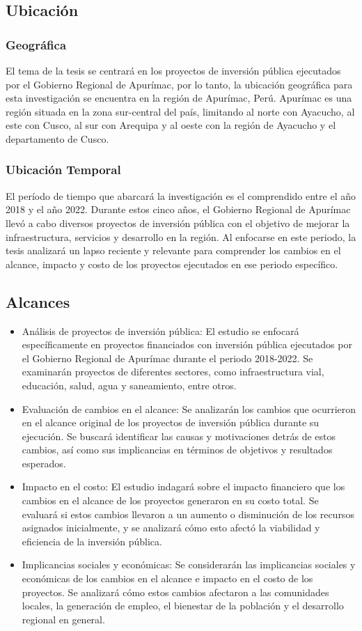\subsection{Ubicación}
\subsubsection{Geográfica}
El tema de la tesis se centrará en los proyectos de inversión pública ejecutados por el Gobierno Regional de Apurímac, por lo tanto, la ubicación geográfica para esta investigación se encuentra en la región de Apurímac, Perú. Apurímac es una región situada en la zona sur-central del país, limitando al norte con Ayacucho, al este con Cusco, al sur con Arequipa y al oeste con la región de Ayacucho y el departamento de Cusco.

\subsubsection{Ubicación Temporal}
El período de tiempo que abarcará la investigación es el comprendido entre el año 2018 y el año 2022. Durante estos cinco años, el Gobierno Regional de Apurímac llevó a cabo diversos proyectos de inversión pública con el objetivo de mejorar la infraestructura, servicios y desarrollo en la región. Al enfocarse en este periodo, la tesis analizará un lapso reciente y relevante para comprender los cambios en el alcance, impacto y costo de los proyectos ejecutados en ese periodo específico.

\subsection{Alcances}
\begin{itemize}
	\item Análisis de proyectos de inversión pública: El estudio se enfocará específicamente en proyectos financiados con inversión pública ejecutados por el Gobierno Regional de Apurímac durante el periodo 2018-2022. Se examinarán proyectos de diferentes sectores, como infraestructura vial, educación, salud, agua y saneamiento, entre otros.
	\item Evaluación de cambios en el alcance: Se analizarán los cambios que ocurrieron en el alcance original de los proyectos de inversión pública durante su ejecución. Se buscará identificar las causas y motivaciones detrás de estos cambios, así como sus implicancias en términos de objetivos y resultados esperados.
	\item Impacto en el costo: El estudio indagará sobre el impacto financiero que los cambios en el alcance de los proyectos generaron en su costo total. Se evaluará si estos cambios llevaron a un aumento o disminución de los recursos asignados inicialmente, y se analizará cómo esto afectó la viabilidad y eficiencia de la inversión pública.
	\item Implicancias sociales y económicas: Se considerarán las implicancias sociales y económicas de los cambios en el alcance e impacto en el costo de los proyectos. Se analizará cómo estos cambios afectaron a las comunidades locales, la generación de empleo, el bienestar de la población y el desarrollo regional en general.
\end{itemize}
